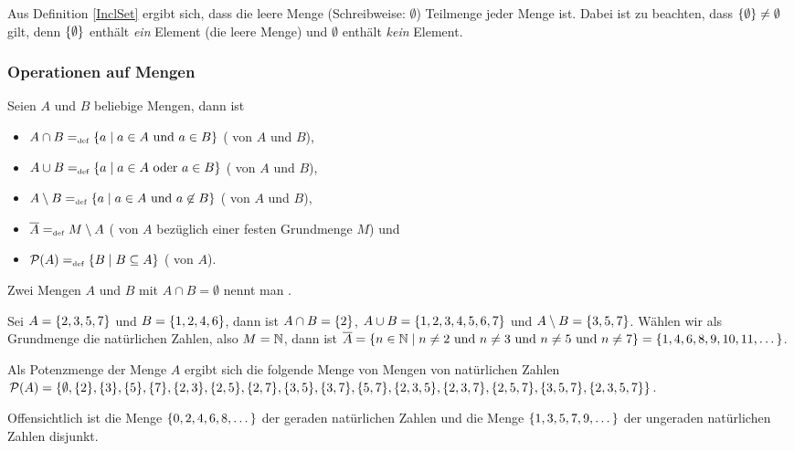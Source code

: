 Aus Definition \ref{InclSet} ergibt sich, dass die leere Menge (Schreibweise: $\emptyset$) Teilmenge jeder Menge ist. Dabei ist zu beachten, dass 
$\{\emptyset\} \not= \emptyset$\index{$\set{\emptyset}$} gilt, denn $\set{\emptyset}$ 
enthält \emph{ein} Element (die leere Menge) und $\emptyset$ enthält \emph{kein} Element.

\subsubsection{Operationen auf Mengen}
\label{OpSetSect}

\begin{definition}
\label{OpSet}
Seien $A$ und $B$ beliebige Mengen, dann ist
\begin{itemize}
%
\item $A \cap B =_{\mathrm{\scriptscriptstyle def}} \{a \mid a \in A \text{ und } a \in B\}$
( von $A$ und $B$)\index{$\cap$},
%
\item $A \cup B =_{\mathrm{\scriptscriptstyle def}} \{a \mid a \in A \text{ oder } a \in B\}$
( von $A$ und $B$)\index{$\cup$},
%
\item $A \setminus B =_{\mathrm{\scriptscriptstyle def}} \{a \mid a \in A \text{ und } a
\not\in B\}$ ( von $A$ und $B$)\index{$\setminus$},
%
\item $\overline{A} =_{\mathrm{\scriptscriptstyle def}} M \setminus A$ ( von $A$ 
bezüglich einer festen Grundmenge $M$) und
%
\item $\mathcal{P}(A) =_{\mathrm{\scriptscriptstyle def}} \{B \mid B \subseteq A\}$ 
( von $A$).
%
\end{itemize}
Zwei Mengen $A$ und $B$ mit $A \cap B = \emptyset$ nennt
man .

\begin{example}
Sei $A = \{2, 3, 5, 7\}$ und $B = \{1, 2, 4 , 6\}$, dann ist $A
\cap B = \{2\}$, $A \cup B = \{1, 2, 3, 4, 5, 6, \allowbreak 7\}$ und $A
\setminus B = \{3, 5, 7\}$. Wählen wir als Grundmenge die
natürlichen Zahlen, also $M = \mathbb N$, dann ist $\overline{A} = \{n \in \mathbb N
\mid n \not= 2 \text{ und } n \not= 3 \text{ und } n
\not= 5 \text{ und } n \not= 7\} = \{1, 4, 6, 8, 9, 10, 11,
\dots\}$. 

Als Potenzmenge der Menge $A$ ergibt sich die folgende Menge von Mengen
von natürlichen Zahlen $\mathcal{P}(A)
= \{\emptyset,\allowbreak \{2\},\allowbreak \{3\},
\allowbreak \{5\},\allowbreak \{7\}, \allowbreak \{2,3\},
\{2,5\}, \allowbreak \{2,7\}, \allowbreak \{3,5\}, \allowbreak\{3,7\},
\allowbreak \{5,7\},\allowbreak \{2,\allowbreak 3,5\},\allowbreak
\{2,3,7\},\allowbreak \{2,5,\allowbreak 7\}, \allowbreak \{3,\allowbreak 5,\allowbreak 7\},\{2,3,5,7\}\}$. 

Offensichtlich ist die Menge $\{0,2,4,6,8, \dots \}$ der geraden
natürlichen Zahlen und die Menge $\{1,3,5,7,9, \dots \}$ der
ungeraden natürlichen Zahlen disjunkt.
\end{example}
\end{definition}


